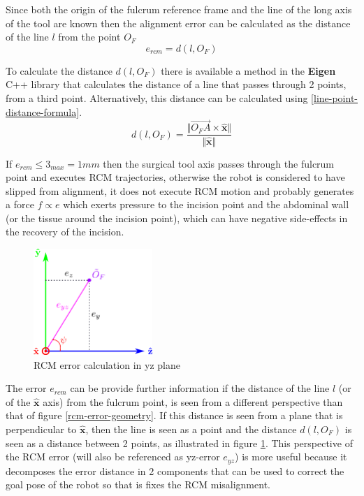Since both the origin of the fulcrum reference frame and the line of the long axis of the tool are known then the alignment error can be calculated as the distance of the line $l$ from the point $O_F$
\begin{equation}
e_{rcm} = d(l, O_F)
\end{equation}

To calculate the distance $d(l, O_F)$ there is available a method in the \textbf{Eigen} C++ library that calculates the distance of a line that passes through 2 points, from a third point. Alternatively, this distance 
can be calculated using \ref{line-point-distance-formula}.
\begin{equation}
\label{line-point-distance-formula}
d(l, O_F) = \frac{\Vert \overrightarrow{O_FA} \times \mathbf{\hat{x}} \Vert}{\Vert \mathbf{\hat{x}} \Vert}
\end{equation}

If $e_{rcm} \leq 3_{max} = 1mm$ then the surgical tool axis passes through the fulcrum point and executes RCM trajectories, otherwise the robot is considered to have slipped from alignment, it does not execute RCM motion and 
probably generates a force $f \propto e$ which exerts pressure to the incision point and the abdominal wall (or the tissue around the incision point), which can have negative side-effects in the recovery of the incision.\\

\begin{center}
\begin{figure}[!htb]
\centering
\includegraphics[width=0.4\textwidth]{images/rcm-error-yz.png}
\caption{RCM error calculation in yz plane}
\label{rcm-error-yz-plane}
\end{figure}
\end{center}

The error $e_{rcm}$ can be provide further information if the distance of the line $l$ (or of the $\mathbf{\hat{x}}$ axis) from the fulcrum point, is seen from a different perspective than that of 
figure \ref{rcm-error-geometry}. If this distance is seen from a plane that is perpendicular to $\mathbf{\hat{x}}$, then the line is seen as a point and the distance $d(l, O_F)$ is seen as a distance between 2 points, 
as illustrated in figure \ref{rcm-error-yz-plane}. This perspective of the RCM error (will also be referenced as yz-error $e_{yz}$) is more useful because it decomposes the error distance in 2 components that can be used to 
correct the goal pose of the robot so that is fixes the RCM misalignment.

